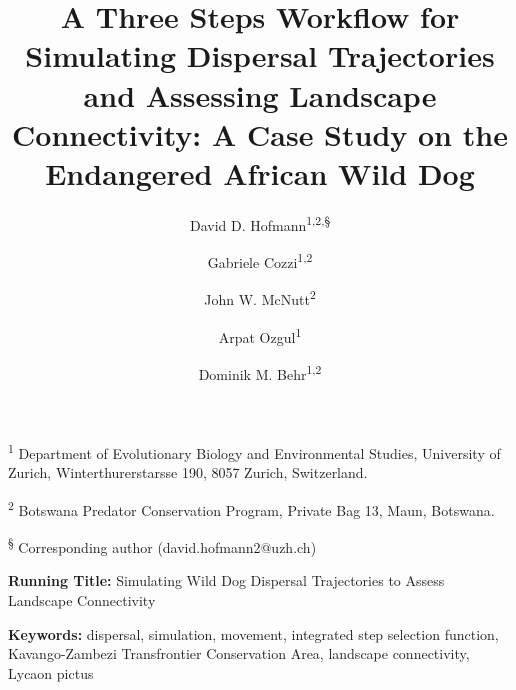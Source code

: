 \documentclass[abstract=on,10pt,a4paper,bibliography=totocnumbered]{article}
\title{A Three Steps Workflow for Simulating Dispersal Trajectories and
Assessing Landscape Connectivity: A Case Study on the Endangered African Wild
Dog}
\author{
  David D. Hofmann\textsuperscript{1,2,\S} \and
  Gabriele Cozzi\textsuperscript{1,2} \and
  John W. McNutt\textsuperscript{2} \and
  Arpat Ozgul\textsuperscript{1} \and
  Dominik M. Behr\textsuperscript{1,2}
}
\begin{document}



\maketitle

\begin{flushleft}

\vspace{0.5cm}

\textsuperscript{1} Department of Evolutionary Biology and Environmental
Studies, University of Zurich, Winterthurerstarsse 190, 8057 Zurich,
Switzerland.

\textsuperscript{2} Botswana Predator Conservation Program, Private Bag 13,
Maun, Botswana.

\textsuperscript{\S} Corresponding author (david.hofmann2@uzh.ch)

\vspace{4cm}

\textbf{Running Title:} Simulating Wild Dog Dispersal Trajectories to Assess
Landscape Connectivity

\vspace{0.5cm}

\textbf{Keywords:} dispersal, simulation, movement, integrated step selection
function, Kavango-Zambezi Transfrontier Conservation Area, landscape
connectivity, Lycaon pictus

\end{flushleft}
\end{document}
